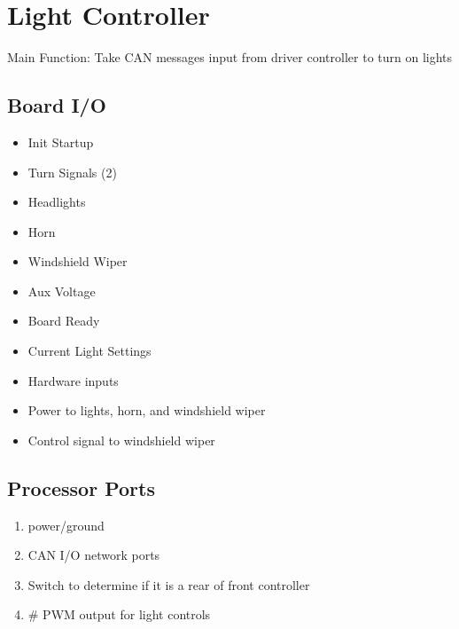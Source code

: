 \documentclass[letterpaper,12pt]{article}
\begin{document}
\pagebreak
\section{Light Controller}
   Main Function: Take CAN messages input from driver controller to turn on lights  
   \subsection{Board I/O}
   \begin{multicols}{2}
   
   \begin{itemize}
      \item Init Startup
      \item Turn Signals (2)
      \item Headlights
      \item Horn
      \item Windshield Wiper
   \end{itemize}
   
   \begin{itemize}
      \item Aux Voltage
   \end{itemize}
   
   \columnbreak
   

   \begin{itemize}
      \item Board Ready
      \item Current Light Settings
   \end{itemize}
   
   \begin{itemize}
      \item Hardware inputs
      \item Power to lights, horn, and windshield wiper
      \item Control signal to windshield wiper
   \end{itemize}
   \end{multicols}

   \subsection{Processor Ports}
   \begin{multicols}{2}
   \begin{enumerate}[(a.)]
      \item power/ground
      \item CAN I/O network ports
      \item Switch to determine if it is a rear of front controller 
      
      \item \# PWM output for light controls 
   \end{enumerate}
   \end{multicols}
\end{document}
